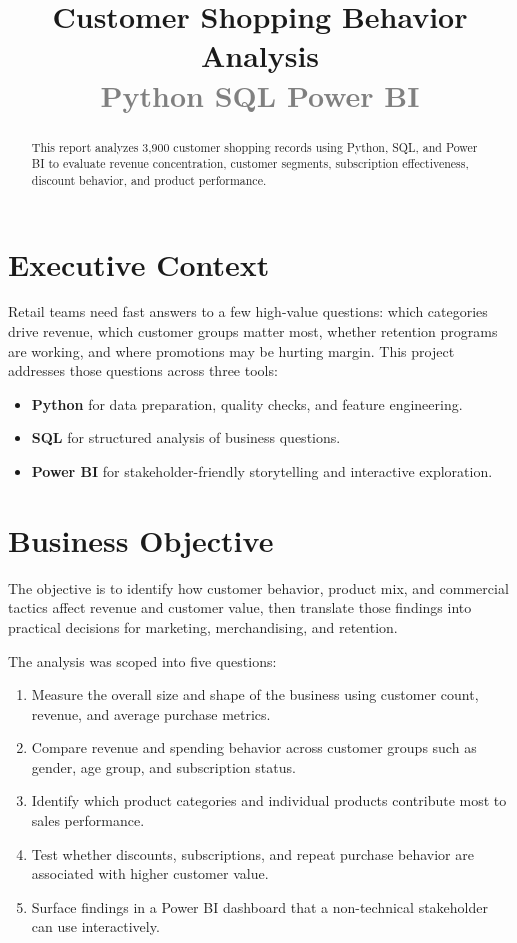 \documentclass[12pt,a4paper]{article}
\title{\textbf{Customer Shopping Behavior Analysis}\\[0.4em]
\large \textcolor{gray}{Python \textbar{} SQL \textbar{} Power BI}}
\author{}
\date{}
\begin{document}
\maketitle
\thispagestyle{empty}

\begin{abstract}
This report analyzes 3,900 customer shopping records using Python, SQL, and Power BI to evaluate revenue concentration, customer segments, subscription effectiveness, discount behavior, and product performance.
\end{abstract}

\clearpage
\tableofcontents
\clearpage

\section{Executive Context}
Retail teams need fast answers to a few high-value questions: which categories drive revenue, which customer groups matter most, whether retention programs are working, and where promotions may be hurting margin. This project addresses those questions across three tools:
\begin{itemize}
  \item \textbf{Python} for data preparation, quality checks, and feature engineering.
  \item \textbf{SQL} for structured analysis of business questions.
  \item \textbf{Power BI} for stakeholder-friendly storytelling and interactive exploration.
\end{itemize}

\section{Business Objective}
The objective is to identify how customer behavior, product mix, and commercial tactics affect revenue and customer value, then translate those findings into practical decisions for marketing, merchandising, and retention.

The analysis was scoped into five questions:
\begin{enumerate}
  \item Measure the overall size and shape of the business using customer count, revenue, and average purchase metrics.
  \item Compare revenue and spending behavior across customer groups such as gender, age group, and subscription status.
  \item Identify which product categories and individual products contribute most to sales performance.
  \item Test whether discounts, subscriptions, and repeat purchase behavior are associated with higher customer value.
  \item Surface findings in a Power BI dashboard that a non-technical stakeholder can use interactively.
\end{enumerate}
\end{document}
